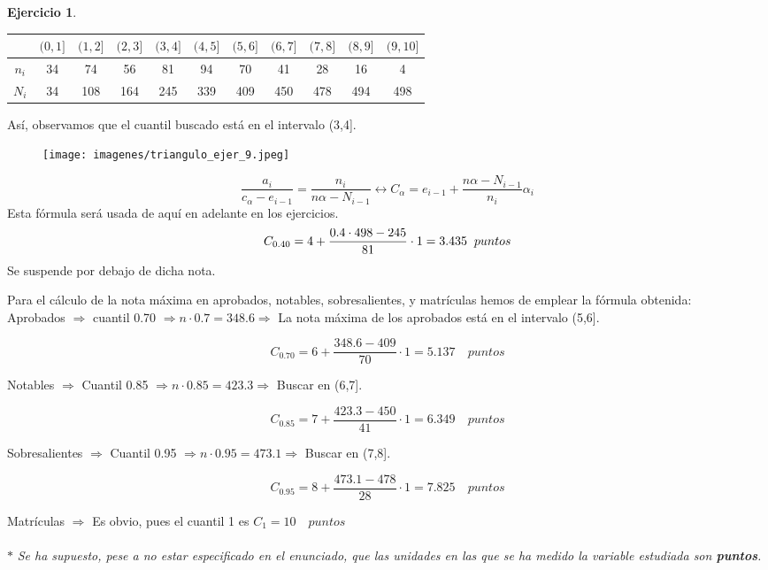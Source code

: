 \documentclass[a4paper, 12pt]{article}
\theoremstyle{definition}
\newtheorem{ej}{Ejercicio}
\begin{document}
\begin{ej}
\begin{center}
\begin{tabular}{|c|c|c|c|c|c|c|c|c|c|c|}
\hline
     & \((0,1]\) & \((1,2]\) & \((2,3]\) & \((3,4]\) & \((4,5]\) & \((5,6]\) & \((6,7]\) & \((7,8]\) & \((8,9]\) & \((9,10]\) \\
     \hline
     \(n_i\) & 34 & 74 & 56 & 81 & 94 & 70 & 41 & 28 & 16 & 4 \\
     \hline
     \(N_i\) & 34 & 108 & 164 & 245 & 339 & 409 & 450 & 478 & 494 & 498 \\
     \hline
\end{tabular}
\end{center}

Así, observamos que el cuantil buscado está en el intervalo (3,4].

\begin{figure}[h!]
    \centering
    \texttt{[image: imagenes/triangulo\_ejer\_9.jpeg]}
\end{figure}

  $$\frac{a_{i}}{c_{\alpha}-e_{i-1}} = \frac{n_{i}}{n\alpha - N_{i-1}} \longleftrightarrow C_{\alpha} = e_{i-1} + \frac{n\alpha - N_{i-1}}{n_{i}}\alpha_{i}$$
Esta fórmula será usada de aquí en adelante en los ejercicios.
\[
C_{0.40} = 4 + \frac{0.4 \cdot 498 -245}{81}\cdot 1 = 3.435 \hspace{0.2cm} puntos\]
 Se suspende por debajo de dicha nota.


Para el cálculo de la nota máxima en aprobados, notables, sobresalientes, y matrículas hemos de emplear la fórmula obtenida: \\

Aprobados \(\Rightarrow\) cuantil 0.70 \(\Rightarrow n \cdot 0.7= 348.6 \Rightarrow\) La nota máxima de los aprobados está en el intervalo (5,6].

\[
C_{0.70} = 6 + \frac{348.6 - 409}{70} \cdot 1 = 5.137\quad puntos
\]

Notables \(\Rightarrow\) Cuantil 0.85 \(\Rightarrow n \cdot 0.85 = 423.3 \Rightarrow\) Buscar en (6,7].

\[
C_{0.85} = 7 + \frac{423.3 - 450}{41} \cdot 1 = 6.349\quad puntos
\]

Sobresalientes \(\Rightarrow\) Cuantil 0.95 \(\Rightarrow n \cdot 0.95 = 473.1 \Rightarrow\) Buscar en (7,8].

\[
C_{0.95} = 8 + \frac{473.1 - 478}{28} \cdot 1 = 7.825\quad puntos
\]

Matrículas \(\Rightarrow\) Es obvio, pues el cuantil 1 es \(C_{1} = 10\quad puntos\) \\
\\
\(\ast\) \textit{Se ha supuesto, pese a no estar especificado en el enunciado, que las unidades en las que se ha medido la variable estudiada son \textbf{puntos}.}


\end{ej}
\end{document}
